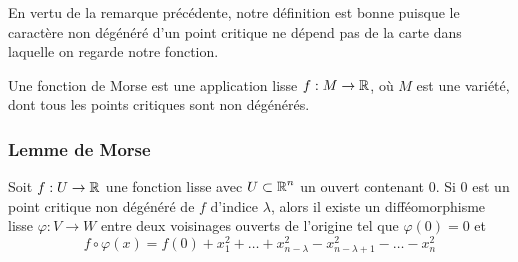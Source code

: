 \begin{remark}
    En vertu de la remarque précédente, notre définition est bonne puisque le caractère
    non dégénéré d'un point critique  ne dépend pas de la carte dans laquelle on regarde notre
    fonction.
\end{remark}

\begin{defi}
    Une fonction de Morse est une application lisse $f:M\to \operatorname{\mathbb R}$, où $M$ est une variété, 
    dont tous les points critiques sont non dégénérés.
\end{defi}

\subsubsection{Lemme de Morse}
\begin{lem}
    Soit $f:U\to\operatorname{\mathbb R}$ une fonction lisse avec $U\subset\operatorname{\mathbb R}^n$ un ouvert contenant $0$. 
    Si $0$ est un point critique non dégénéré de $f$ d'indice $\lambda$, alors il existe un 
    difféomorphisme lisse $\varphi:V\to W$ entre deux voisinages ouverts de l'origine 
    tel que $\varphi(0)=0$ et 
    \[
        f\circ\varphi(x)=f(0)+x_1^2+\dots+x_{n-\lambda}^2-x_{n-\lambda+1}^2-\dots-x_n^2
    \]
\end{lem}

